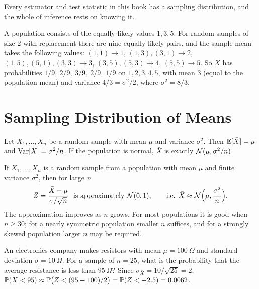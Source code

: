 Every estimator and test statistic in this book has a sampling distribution, and the whole of inference rests on knowing it.

\begin{example}
A population consists of the equally likely values $1,3,5$. For random samples of size $2$ with replacement there are nine equally likely pairs, and the sample mean takes the following values: $(1,1)\to1$, $(1,3),(3,1)\to2$, $(1,5),(5,1),(3,3)\to3$, $(3,5),(5,3)\to4$, $(5,5)\to5$. So $\bar{X}$ has probabilities $1/9,\ 2/9,\ 3/9,\ 2/9,\ 1/9$ on $1,2,3,4,5$, with mean $3$ (equal to the population mean) and variance $4/3=\sigma^2/2$, where $\sigma^2=8/3$.
\end{example}

\section{Sampling Distribution of Means}\label{sec:sampmeans}

\begin{theorem}\label{thm:dist-xbar}
Let $X_1,\dots,X_n$ be a random sample with mean $\mu$ and variance $\sigma^2$. Then $\mathbb{E}[\bar{X}]=\mu$ and $\operatorname{Var}[\bar{X}]=\sigma^2/n$. If the population is normal, $\bar{X}$ is exactly $\mathcal{N}(\mu,\sigma^2/n)$.
\end{theorem}

\begin{theorem}\label{thm:clt-text}
If $X_1,\dots,X_n$ is a random sample from a population with mean $\mu$ and finite variance $\sigma^2$, then for large $n$
\[ Z=\frac{\bar{X}-\mu}{\sigma/\sqrt n}\ \text{ is approximately }\Normal(0,1),\qquad\text{i.e. }\bar{X}\approx\Normal\Big(\mu,\frac{\sigma^2}n\Big). \]
The approximation improves as $n$ grows. For most populations it is good when $n\ge30$; for a nearly symmetric population smaller $n$ suffices, and for a strongly skewed population larger $n$ may be required.
\end{theorem}

\begin{example}
An electronics company makes resistors with mean $\mu=100\ \Omega$ and standard deviation $\sigma=10\ \Omega$. For a sample of $n=25$, what is the probability that the average resistance is less than $95\ \Omega$? Since $\sigma_{\bar{X}}=10/\sqrt{25}=2$, $\mathbb{P}(\bar{X}<95)\approx\mathbb{P}\big(Z<(95-100)/2\big)=\mathbb{P}(Z<-2.5)=0.0062$.
\end{example}

